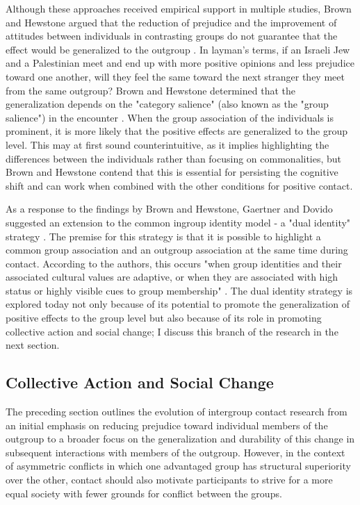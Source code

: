 \documentclass[dissertation,math,vertlayout,pdfa,colorlinks]{aaltoseries}
\begin{document}
Although these approaches received empirical support in multiple studies, Brown and Hewstone argued that the reduction of prejudice and the improvement of attitudes between individuals in contrasting groups do not guarantee that the effect would be generalized to the outgroup \cite{brownIntegrativeTheoryIntergroup2005}. In layman's terms, if an Israeli Jew and a Palestinian meet and end up with more positive opinions and less prejudice toward one another, will they feel the same toward the next stranger they meet from the same outgroup? Brown and Hewstone determined that the generalization depends on the "category salience" (also known as the "group salience") in the encounter \cite{brownChangingAttitudesIntergroup1999,brownIntegrativeTheoryIntergroup2005}. When the group association of the individuals is prominent, it is more likely that the positive effects are generalized to the group level. This may at first sound counterintuitive, as it implies highlighting the differences between the individuals rather than focusing on commonalities, but Brown and Hewstone contend that this is essential for persisting the cognitive shift and can work when combined with the other conditions for positive contact.

As a response to the findings by Brown and Hewstone, Gaertner and Dovido suggested an extension to the common ingroup identity model - a "dual identity" strategy \cite{gaertnerCategorizationRecategorizationIntergroup2005, brownIntegrativeTheoryIntergroup2005}. The premise for this strategy is that it is possible to highlight a common group association and an outgroup association at the same time during contact. According to the authors, this occurs "when group identities and their associated cultural values are adaptive, or when they are associated with high status or highly visible cues to group membership" \cite[p. 80]{gaertnerCategorizationRecategorizationIntergroup2005}. The dual identity strategy is explored today not only because of its potential to promote the generalization of positive effects to the group level but also because of its role in promoting collective action and social change; I discuss this branch of the research in the next section.

\subsection{Collective Action and Social Change}
\label{sec:collective_action}
The preceding section outlines the evolution of intergroup contact research from an initial emphasis on reducing prejudice toward individual members of the outgroup to a broader focus on the generalization and durability of this change in subsequent interactions with members of the outgroup. However, in the context of asymmetric conflicts in which one advantaged group has structural superiority over the other, contact should also motivate participants to strive for a more equal society with fewer grounds for conflict between the groups. 
\end{document}
